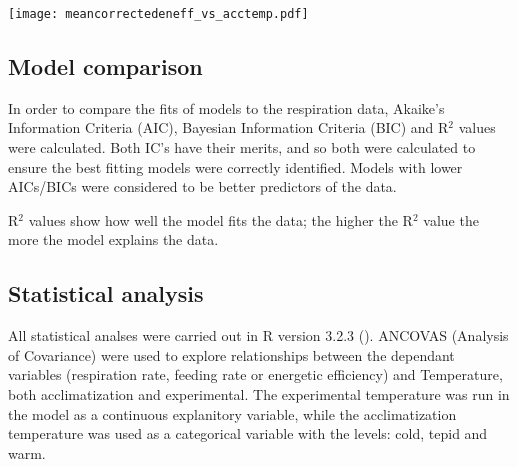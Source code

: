 \documentclass[../../Paper.tex]{subfiles}
\begin{document}
\begin{figure*}[!t]
\centering
\texttt{[image: meancorrectedeneff\_vs\_acctemp.pdf]}
\caption{Energetic efficiency of \textit{R. balthica} plotted against acclimatization temperature. Tepid (14.3\degree C) and
warm (19.3\degree C) acclimatization differed significantly (p \textless 0.01), whilst cold (9.6\degree C)/warm
and cold/tepid returned non-significant results
( p \textgreater 0.08).}
\end{figure*}

\subsection*{Model comparison}

In order to compare the fits of models to
the respiration data, Akaike’s Information Criteria (AIC), Bayesian Information Criteria 
(BIC) and R$^2$ values were calculated. Both IC's have their 
merits, and so both were calculated to ensure the best fitting 
models were correctly identified. Models with lower AICs/BICs were considered 
to be better predictors of the data.

R$^2$ values show how well the model fits the data; the higher the R$^2$ value 
the more the model explains the data.



\subsection*{Statistical analysis}

All statistical analses were carried out in R version 3.2.3 (\cite{r_core_team_r:_2013}).
ANCOVAS (Analysis of Covariance) were used to explore relationships between the 
dependant variables (respiration rate, feeding rate or energetic efficiency) and Temperature, 
both acclimatization and experimental. The experimental temperature was run in the
model as a continuous explanitory variable, while the acclimatization temperature
was used as a categorical variable with the levels: cold, tepid and warm. 
\end{document}
